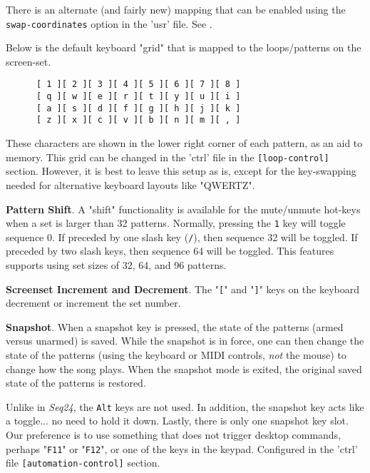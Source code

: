    There is an alternate (and fairly new) mapping that can be enabled
   using the \texttt{swap-coordinates} option in the 'usr' file.
   See .

   Below is the default keyboard "grid" that is
   mapped to the loops/patterns on the screen-set.

   \begin{verbatim}
      [ 1 ][ 2 ][ 3 ][ 4 ][ 5 ][ 6 ][ 7 ][ 8 ]
      [ q ][ w ][ e ][ r ][ t ][ y ][ u ][ i ]
      [ a ][ s ][ d ][ f ][ g ][ h ][ j ][ k ]
      [ z ][ x ][ c ][ v ][ b ][ n ][ m ][ , ]
   \end{verbatim}

   These characters are shown in the lower right corner of each
   pattern, as an aid to memory.
   This grid can be changed in the 'ctrl' file in the
   \texttt{[loop-control]} section.
   However, it is best to leave this setup as is, except for the key-swapping
   needed for alternative keyboard layouts like "QWERTZ".

   \textbf{Pattern Shift}.
   A "shift" functionality is available for the
   mute/unmute hot-keys when a set is larger than 32 patterns.
   Normally, pressing the \texttt{1} key will toggle
   sequence 0.  If preceded by one slash key (\texttt{/}), then sequence 32
   will be toggled.  If preceded by two slash keys, then sequence 64 will be
   toggled.  This features supports using set sizes of 32, 64, and 96 patterns.

   \index{keys![}
   \textbf{Screenset Increment and Decrement}.
   The "\texttt{[}" and
   \index{keys!]}
   "\texttt{]}" keys on the keyboard decrement or increment the set number.

   \textbf{Snapshot}.
   When a snapshot key is pressed, the state of the patterns
   (armed versus unarmed) is saved.  While the
   snapshot is in force, one can then change the state of the patterns
   (using the keyboard or MIDI controls, \textsl{not} the mouse)
   to change how the song plays.  When the snapshot mode is exited, the
   original saved state of the patterns is restored.

   Unlike in \textsl{Seq24}, the \texttt{Alt} keys are not used.
   In addition, the snapshot key acts like a toggle... no need to hold it down.
   Lastly, there is only one snapshot key slot.
   Our preference is to use something that does not trigger desktop
   commands, perhaps "\texttt{F11}" or "\texttt{F12}", or one of the keys in
   the keypad.
   Configured in the 'ctrl' file
   \texttt{[automation-control]} section.

